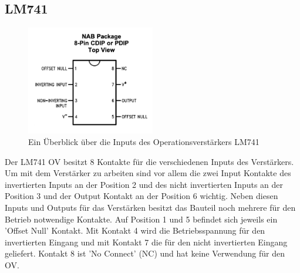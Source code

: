     \subsection{LM741}
        \begin{figure}[ht]
            \centering
            \includegraphics[width = 0.5\textwidth]{bilder/LM741.png}
            \caption{Ein Überblick über die Inputs des Operationsverstärkers LM741}
            \label{fig:LM741}
        \end{figure}
        Der LM741 OV besitzt 8 Kontakte für die verschiedenen Inputs des Verstärkers.
        Um mit dem Verstärker zu arbeiten sind vor allem die zwei Input Kontakte des invertierten Inputs an der Position 2 und des nicht invertierten Inputs an der Position 3 und der Output Kontakt an der Position 6 wichtig.
        Neben diesen Inputs und Outputs für das Verstärken besitzt das Bauteil noch mehrere für den Betrieb notwendige Kontakte.
        Auf Position 1 und 5 befindet sich jeweils ein 'Offset Null' Kontakt.
        Mit Kontakt 4 wird die Betriebsspannung für den invertierten Eingang und mit Kontakt 7 die für den nicht invertierten Eingang geliefert.
        Kontakt 8 ist 'No Connect' (NC) und hat keine Verwendung für den OV.
